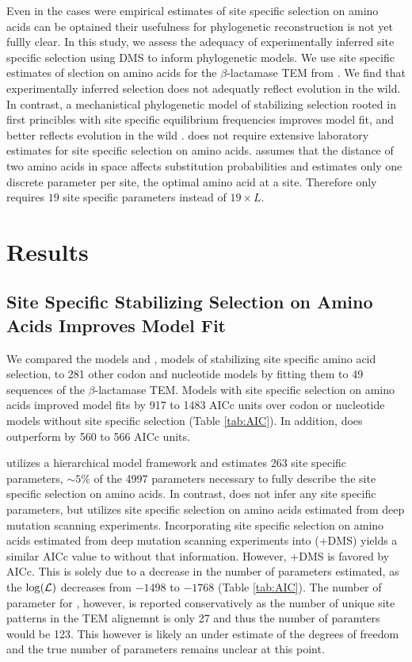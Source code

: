\documentclass[12pt]{article}
\begin{document}
Even in the cases were empirical estimates of site specific selection on amino acids can be optained their usefulness for phylogenetic reconstruction is not yet fullly clear.
In this study, we assess the adequacy of experimentally inferred site specific selection using DMS to inform phylogenetic models.
We use site specific estimates of slection on amino acids for the $\beta$-lactamase TEM from \citet{stiffler2016}.
We find that experimentally inferred selection does not adequatly reflect evolution in the wild.
In contrast, \selac a mechanistical phylogenetic model of stabilizing selection rooted in first princibles with site specific equilibrium frequencies improves model fit, and better reflects evolution in the wild \citep{beaulieu2018}.
\selac does not require extensive laboratory estimates for site specific selection on amino acids.
\selac assumes that the distance of two amino acids in \PC space affects substitution probabilities and estimates only one discrete parameter per site, the optimal amino acid at a site.
Therefore \selac only requires $19$ site specific parameters instead of $19\times L$.

\section*{Results}
\subsection*{Site Specific Stabilizing Selection on Amino Acids Improves Model Fit}
We compared the models \phydms \citep{hilton2017} and \selac, models of stabilizing site specific amino acid selection, to 281 other codon and nucleotide models by fitting them to 49 sequences of the $\beta$-lactamase TEM.
Models with site specific selection on amino acids improved model fits by 917 to 1483 AICc units over codon or nucleotide models without site specific selection (Table \ref{tab:AIC}).
In addition, \selac does outperform \phydms by 560 to  566 AICc units.

\selac utilizes a hierarchical model framework and estimates 263 site specific parameters, $\sim5\%$ of the 4997 parameters necessary to fully describe the site specific selection on amino acids.
In contrast, \phydms does not infer any site specific parameters, but utilizes site specific selection on amino acids estimated from deep mutation scanning experiments.
Incorporating site specific selection on amino acids estimated from deep mutation scanning experiments into \selac (\selac+DMS) yields a similar AICc value to \selac without that information.
However, \selac+DMS is favored by AICc.
This is solely due to a decrease in the number of parameters estimated, as the $\log(\mathcal{L})$ decreases from $-1498$ to $-1768$ (Table \ref{tab:AIC}).
The number of parameter for \selac, however, is reported conservatively as the number of unique site patterns in the TEM alignemnt is only 27 and thus the number of paramters would be 123.
This however is likely an under estimate of the degrees of freedom and the true number of parameters remains unclear at this point.
\end{document}
